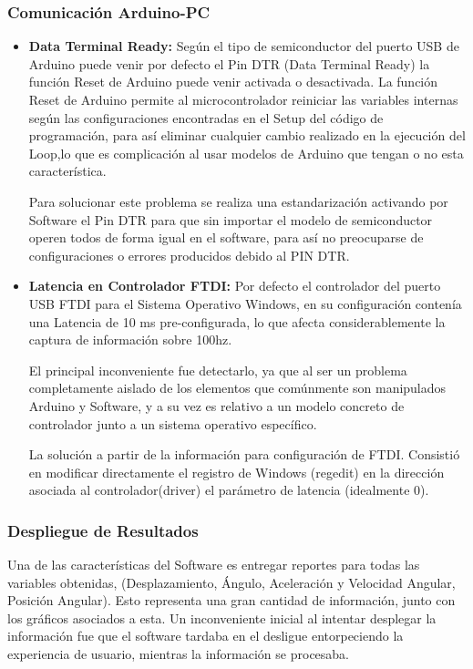\documentclass[12pt,a4paper]{article}
\begin{document}
\subsubsection{Comunicación Arduino-PC}
\begin{itemize}
	\item \textbf{Data Terminal Ready:} Según el tipo de semiconductor del puerto USB de Arduino puede venir por defecto el Pin DTR (Data Terminal Ready) la función Reset de Arduino puede venir activada o desactivada. 
	La función Reset de Arduino permite al microcontrolador reiniciar las variables internas según las configuraciones encontradas en el Setup del código de programación, para así eliminar cualquier cambio realizado en la ejecución del Loop,lo que es complicación al usar modelos de Arduino que tengan o no esta característica.
	
	Para solucionar este problema se realiza una estandarización activando por Software el Pin DTR para que sin importar el modelo de semiconductor operen todos de forma igual en el software, para así no preocuparse de configuraciones o errores producidos debido al PIN DTR.

	\newpage
	\item \textbf{Latencia en Controlador FTDI:} Por defecto el controlador del puerto USB FTDI para el Sistema Operativo Windows, en su configuración contenía una Latencia de 10 ms pre-configurada, lo que afecta considerablemente la captura de información sobre 100hz. 
	
	El principal inconveniente fue detectarlo, ya que al ser un problema completamente aislado de los elementos que comúnmente son manipulados Arduino y Software, y a su vez es relativo a un modelo concreto de controlador junto a un sistema operativo específico.
	
	La solución a partir de la información para configuración de FTDI\cite{FTDI}. Consistió en modificar directamente el registro de Windows (regedit) en la dirección asociada al controlador(driver) el parámetro de latencia (idealmente 0).
\end{itemize}

\subsubsection{Despliegue de Resultados}
Una de las características del Software es entregar reportes para todas las variables obtenidas, (Desplazamiento, Ángulo, Aceleración y Velocidad Angular, Posición Angular). Esto representa una gran cantidad de información, junto con los gráficos asociados a esta. Un inconveniente inicial al intentar desplegar la información fue que el software tardaba en el desligue entorpeciendo la experiencia de usuario, mientras la información se procesaba.
\end{document}
